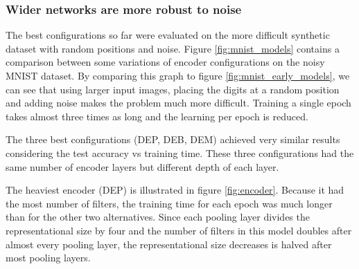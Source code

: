 
\subsubsection{Wider networks are more robust to noise}

The best configurations so far were evaluated on the more difficult synthetic dataset with random positions and noise. Figure \ref{fig:mnist_models} contains a comparison between some variations of encoder configurations on the noisy MNIST dataset.
By comparing this graph to figure \ref{fig:mnist_early_models}, we can see that using larger input images, placing the digits at a random position and adding noise makes the problem much more difficult. Training a single epoch takes almost three times as long and the learning per epoch is reduced.

The three best configurations (DEP, DEB, DEM) achieved very similar results considering the test accuracy vs training time. These three configurations had the same number of encoder layers but different depth of each layer.

The heaviest encoder (DEP) is illustrated in figure \ref{fig:encoder}.
Because it had the most number of filters, the training time for each epoch was much longer than for the other two alternatives.
Since each pooling layer divides the representational size by four and the number of filters in this model doubles after almost every pooling layer, the representational size decreases is halved after most pooling layers.

